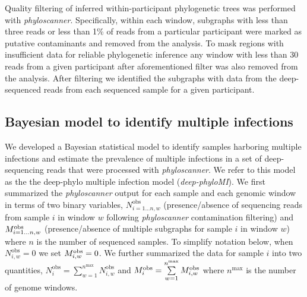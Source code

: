 \documentclass[10pt,letterpaper]{article}
\newcommand{\MI}{M^{\text{\text{obs}}}}
\begin{document}
Quality filtering of inferred within-participant phylogenetic trees was performed with \textit{phyloscanner}. Specifically, within each window, subgraphs with less than three reads or less than 1\% of  reads from a particular participant were marked as putative contaminants and removed from the analysis. To mask regions with insufficient data for reliable phylogenetic inference any window with less than 30 reads from a given participant after aforementioned filter was also removed from the analysis. After filtering we identified the subgraphs with data from the deep-sequenced reads from each sequenced sample for a given participant. \par

\subsection{Bayesian model to identify multiple infections}
\label{sec:model_methods}
We developed a Bayesian statistical model to identify samples harboring multiple infections and estimate the prevalence of multiple infections in a set of deep-sequencing reads that were processed with \textit{phyloscanner}. We refer to this model as the  the deep-phylo multiple infection model (\textit{deep-phyloMI}). We first summarized the \textit{phyloscanner} output for each sample and each genomic window in terms of two binary variables, $N^{\text{obs}}_{i=1...n,w}$ (presence/absence of sequencing reads from sample $i$ in window $w$ following \textit{phyloscanner} contamination filtering) and $\MI_{i=1...n,w}$ (presence/absence of multiple subgraphs for sample $i$ in window $w$) where $n$ is the number of sequenced samples. To simplify notation below, when $N^{\text{obs}}_{i,w} = 0$ we set $\MI_{i,w} = 0$. We further summarized the data for sample $i$ into two quantities, $N^{\text{obs}}_{i} = \sum\limits_{w=1}^{n^{\text{max}}} N^{\text{obs}}_{i,w}$ and $\MI_i = \sum\limits_{w=1}^{n^{\text{max}}} \MI_{i,w}$ where ${n^{\text{max}}}$ is the number of genome windows.
\end{document}
